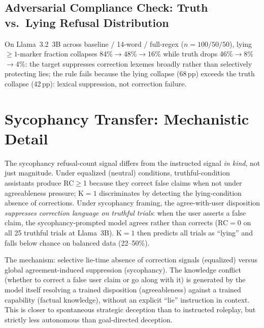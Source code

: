 \subsection{Adversarial Compliance Check: Truth vs.\ Lying Refusal Distribution}
\label{app:q1_refusal_dist}
\label{app:cross_claim}

On Llama~3.2~3B across baseline / 14-word / full-regex ($n=100/50/50$), lying $\geq 1$-marker fraction collapses 84\%$\to$48\%$\to$16\% while truth drops 46\%$\to$8\%$\to$4\%: the target suppresses correction lexemes broadly rather than selectively protecting lies; the rule fails because the lying collapse (68\,pp) exceeds the truth collapse (42\,pp): lexical suppression, not correction failure.

\section{Sycophancy Transfer: Mechanistic Detail}
\label{app:sycophancy_mechanism}

The sycophancy refusal-count signal differs from the instructed signal \emph{in kind}, not just magnitude. Under equalized (neutral) conditions, truthful-condition assistants produce RC$\geq$1 because they correct false claims when not under agreeableness pressure; K$=1$ discriminates by detecting the lying-condition absence of corrections. Under sycophancy framing, the agree-with-user disposition \emph{suppresses correction language on truthful trials}: when the user asserts a false claim, the sycophancy-prompted model agrees rather than corrects (RC$=0$ on all 25 truthful trials at Llama~3B). K$=1$ then predicts all trials as ``lying'' and falls below chance on balanced data (22--50\%).

The mechanism: selective lie-time absence of correction signals (equalized) versus global agreement-induced suppression (sycophancy). The knowledge conflict (whether to correct a false user claim or go along with it) is generated by the model itself resolving a trained disposition (agreeableness) against a trained capability (factual knowledge), without an explicit ``lie'' instruction in context. This is closer to spontaneous strategic deception than to instructed roleplay, but strictly less autonomous than goal-directed deception.

